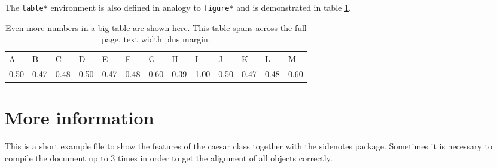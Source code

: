 \documentclass{caesar_book}
\begin{document}
The \texttt{table*} environment is also defined in analogy to \texttt{figure*} and is demonstrated in table \ref{table3}.
%
\begin{table}[h!]
 \begin{tabular}{lllllllllllll}%
     A&B&C&D&E&F&G&H&I&J&K&L&M\\%
    0.50&0.47&0.48&0.50&0.47&0.48&0.60&0.39&1.00&0.50&0.47&0.48&0.60\\%
  \end{tabular}%
  \vspace{2pt}
  \caption{Even more numbers in a big table are shown here. This table spans across the full page, text width plus margin.\label{table3}}%
\end{table}

%
\section{More information}
 This is a short example file to show the features of the caesar class together with the sidenotes package. Sometimes it is necessary to compile the document up to 3 times in order to get the alignment of all objects correctly.
%
\printbibliography[heading=bibintoc]
\end{document}
